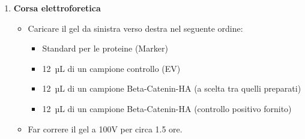 \begin{enumerate}
\item \textbf{Corsa elettroforetica}
  \begin{itemize}
    \item Caricare il gel da sinistra verso destra nel seguente ordine:
      \begin{itemize}
        \item Standard per le proteine (Marker)
        \item 12~µL di un campione controllo (EV)
        \item 12~µL di un campione Beta-Catenin-HA (a scelta tra quelli preparati)
        \item 12~µL di un campione Beta-Catenin-HA (controllo positivo fornito)
      \end{itemize}
    \item Far correre il gel a 100V per circa 1.5 ore.
  \end{itemize}
\end{enumerate}

